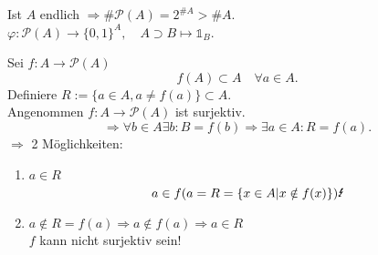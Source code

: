 \documentclass[../ana1.tex]{subfiles}
\begin{document}
\begin{bem}
	Ist \(A\) endlich \( \Rightarrow \# \mathcal{P} (A) = 2^{\# A} > \#A \).\\
	\( \varphi: \mathcal{P}(A) \rightarrow {\{0,1\}}^A, \quad A\supset B \mapsto \mathds{1}_B \).
\end{bem}
\begin{bew}
	Sei \(f: A \rightarrow \mathcal{P}(A) \)
	\[ f(A) \subset A \quad \forall a \in A. \]
	Definiere \(R := \{a\in A, a \neq f(a)\} \subset A \).\\
	Angenommen \(f: A \rightarrow \mathcal{P}(A) \) ist surjektiv.
	\[ \Rightarrow \forall b\in A \exists b : B=f(b) \Rightarrow \exists a\in A : R = f(a). \]
	\(\Rightarrow \) 2 Möglichkeiten:
	\begin{enumerate}
		\item \(a\in R\) \[ a\in f(a = R = \{x\in A| x\notin f(x)\}) \text{\Lightning{}} \]
		\item \(a \notin R = f(a) \Rightarrow a \notin f(a) \Rightarrow a\in R \) \Lightning{}\\
		      \( f\) kann nicht surjektiv sein!
	\end{enumerate}
\end{bew}
\end{document}
